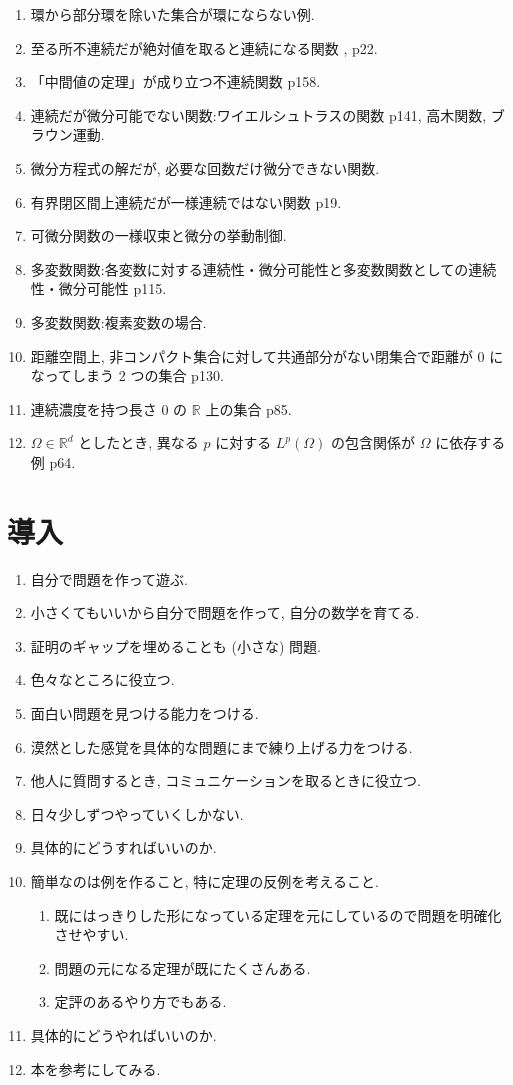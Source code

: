 \documentclass[openany, a4paper, oneside]{jsbook}
\begin{document}
\begin{enumerate}
\item 環から部分環を除いた集合が環にならない例.
\item 至る所不連続だが絶対値を取ると連続になる関数 \cite{GelbaumOlmsted1}, p22.
\item 「中間値の定理」が成り立つ不連続関数 \cite{WilliamDumham1} p158.
\item 連続だが微分可能でない関数:ワイエルシュトラスの関数 \cite{WilliamDumham1} p141, 高木関数, ブラウン運動.
\item 微分方程式の解だが, 必要な回数だけ微分できない関数.
\item 有界閉区間上連続だが一様連続ではない関数 \cite{GelbaumOlmsted1} p19.
\item 可微分関数の一様収束と微分の挙動制御.
\item 多変数関数:各変数に対する連続性・微分可能性と多変数関数としての連続性・微分可能性 \cite{GelbaumOlmsted1} p115.
\item 多変数関数:複素変数の場合.
\item 距離空間上, 非コンパクト集合に対して共通部分がない閉集合で距離が 0 になってしまう 2 つの集合 \cite{GelbaumOlmsted1} p130.
\item 連続濃度を持つ長さ 0 の $\mathbb{R}$ 上の集合 \cite{GelbaumOlmsted1} p85.
\item $\Omega \in \mathbb{R}^d$ としたとき, 異なる $p$ に対する $L^p (\Omega)$ の包含関係が $\Omega$ に依存する例 \cite{DavidWilliams1} p64.
\end{enumerate}
\section{導入}

\begin{enumerate}
\item 自分で問題を作って遊ぶ.
\item 小さくてもいいから自分で問題を作って, 自分の数学を育てる.
\item 証明のギャップを埋めることも (小さな) 問題.
\item 色々なところに役立つ.
\item 面白い問題を見つける能力をつける.
\item 漠然とした感覚を具体的な問題にまで練り上げる力をつける.
\item 他人に質問するとき, コミュニケーションを取るときに役立つ.
\item 日々少しずつやっていくしかない.
\item 具体的にどうすればいいのか.
\item 簡単なのは例を作ること, 特に定理の反例を考えること.
\begin{enumerate}
\item 既にはっきりした形になっている定理を元にしているので問題を明確化させやすい.
\item 問題の元になる定理が既にたくさんある.
\item 定評のあるやり方でもある.
\end{enumerate}
\item 具体的にどうやればいいのか.
\item 本を参考にしてみる.
\end{enumerate}
\end{document}
